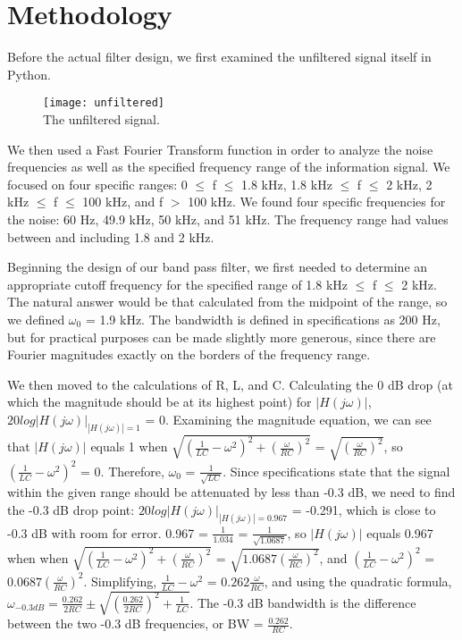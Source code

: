 \documentclass[11pt,a4,titlepage]{article}
\begin{document}
\section{Methodology}
Before the actual filter design, we first examined the unfiltered signal itself in Python.

\begin{figure}[H]
	\centering
	\texttt{[image: unfiltered]}
	\\ The unfiltered signal.
\end{figure}

We then used a Fast Fourier Transform function in order to analyze the noise frequencies as well as the specified frequency range of the information signal. We focused on four specific ranges: 0 $\leq$ f $\leq$ 1.8 kHz, 1.8 kHz $\leq$ f $\leq$ 2 kHz, 2 kHz $\leq$ f $\leq$ 100 kHz, and f $>$ 100 kHz. We found four specific frequencies for the noise: 60 Hz, 49.9 kHz, 50 kHz, and 51 kHz. The frequency range had values between and including 1.8 and 2 kHz.

Beginning the design of our band pass filter, we first needed to determine an appropriate cutoff frequency for the specified range of 1.8 kHz $\leq$ f $\leq$ 2 kHz. The natural answer would be that calculated from the midpoint of the range, so we defined $\omega_{0}$ = 1.9 kHz. The bandwidth is defined in specifications as 200 Hz, but for practical purposes can be made slightly more generous, since there are Fourier magnitudes exactly on the borders of the frequency range.

We then moved to the calculations of R, L, and C. Calculating the 0 dB drop (at which the magnitude should be at its highest point) for $|H(j\omega)|$, $20log|H(j\omega)|_{|H(j\omega)| = 1}$ = 0. Examining the magnitude equation, we can see that $|H(j\omega)|$ equals 1 when $\sqrt{(\frac{1}{LC} - \omega^2)^2 + (\frac{\omega}{RC})^2}$ = $\sqrt{(\frac{\omega}{RC})^2}$, so $(\frac{1}{LC} - \omega^2)^2$ = 0. Therefore, $\omega_{0}$ = $\frac{1}{\sqrt{LC}}$. Since specifications state that the signal within the given range should be attenuated by less than -0.3 dB, we need to find the -0.3 dB drop point: $20log|H(j\omega)|_{|H(j\omega)| = 0.967}$ = -0.291, which is close to -0.3 dB with room for error. 0.967 = $\frac{1}{1.034}$ = $\frac{1}{\sqrt{1.0687}}$, so $|H(j\omega)|$ equals 0.967 when when $\sqrt{(\frac{1}{LC} - \omega^2)^2 + (\frac{\omega}{RC})^2}$ = $\sqrt{1.0687(\frac{\omega}{RC})^2}$, and $(\frac{1}{LC} - \omega^2)^2$ = $0.0687(\frac{\omega}{RC})^2$. Simplifying, $\frac{1}{LC} - \omega^2$ = $0.262\frac{\omega}{RC}$, and using the quadratic formula, $\omega_{-0.3dB} = \frac{0.262}{2RC} \pm \sqrt{(\frac{0.262}{2RC})^2 + \frac{1}{LC}}$. The -0.3 dB bandwidth is the difference between the two -0.3 dB frequencies, or BW = $\frac{0.262}{RC}$.
\end{document}
